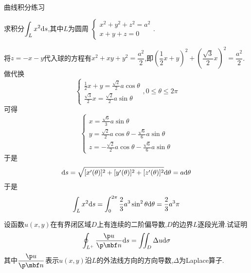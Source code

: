 \documentclass{ctexart}
\begin{document}
\pagestyle{empty}
\begin{center}\large 曲线积分练习\end{center}
\begin{problem}[A.1]
    求积分$\displaystyle\int_{L}x^2\mathrm{d} s$,其中$L$为圆周
    $\left\{\begin{array}{l}
        x^2+y^2+z^2=a^2\\x+y+z=0
    \end{array}\right.$.
\end{problem}
\begin{solution}
    将$z=-x-y$代入球的方程有$x^2+xy+y^2=\dfrac{a^2}{2}$,即$\left(\dfrac{1}{2}x+y\right)^2+\left(\dfrac{\sqrt3}{2}x\right)^2=\dfrac{a^2}{2}$.做代换
    \[\left\{\begin{array}{l}
        \frac{1}{2}x+y=\frac{\sqrt2}{2}a\cos\theta \\
        \frac{\sqrt{3}}{2}x=\frac{\sqrt2}{2}a\sin\theta
    \end{array}\right.,0\leqslant\theta\leqslant2\pi\]
    可得
    \[\left\{\begin{array}{l}
        x=\frac{\sqrt6}{3}a\sin\theta \\
        y=\frac{\sqrt2}{2}a\cos\theta-\frac{\sqrt6}{6}a\sin\theta \\
        z=-\frac{\sqrt2}{2}a\cos\theta-\frac{\sqrt6}{6}a\sin\theta
    \end{array}\right.\]
    于是
    \[\mathrm{d} s=\sqrt{[x'(\theta)]^2+[y'(\theta)]^2+[z'(\theta)]^2}\mathrm{d}\theta=a\mathrm{d}\theta\]
    于是
    \[\int_Lx^2\mathrm{d} s=\int_0^{2\pi}\dfrac{2}{3}a^3\sin^2\theta\mathrm{d}\theta=\dfrac{2}{3}a^3\pi\]
\end{solution}
\begin{problem}[C.1]
    设函数$u(x,y)$在有界闭区域$D$上有连续的二阶偏导数,$D$的边界$L$逐段光滑.试证明
    \[\oint_{L^+}\dfrac{\p u}{\p\mbf n}\di s=\iint_D\Delta u\di\sigma\]
    其中$\dfrac{\p u}{\p\mbf n}$表示$u(x,y)$沿$L$的外法线方向的方向导数,$\Delta$为Laplace算子.
\end{problem}
\end{document}

